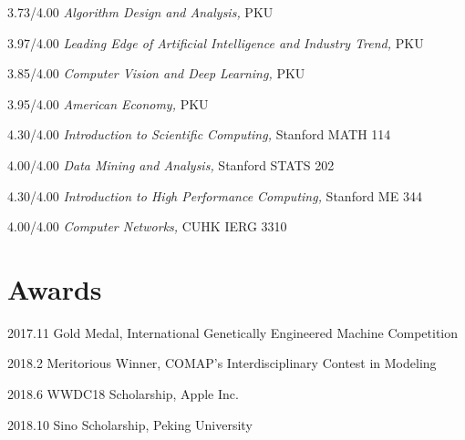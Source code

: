 \documentclass{academiccv}
\begin{document}
\begin{tablist}

\item[3.73/4.00] \tab \emph{Algorithm Design and Analysis}\emph, PKU
\item[3.97/4.00] \tab  \emph{Leading Edge of Artificial Intelligence and Industry Trend}\emph, PKU
\item[3.85/4.00] \tab \emph{Computer Vision and Deep Learning}\emph, PKU

\item[3.95/4.00] \tab \emph{American Economy}\emph, PKU

\item[4.30/4.00] \tab \emph{Introduction to Scientific Computing}\emph, Stanford MATH 114

\item[4.00/4.00] \tab \emph{Data Mining and Analysis}\emph, Stanford STATS 202

\item[4.30/4.00] \tab \emph{Introduction to High Performance Computing}\emph, Stanford ME 344

\item[4.00/4.00] \tab \emph{Computer Networks}\emph, CUHK IERG 3310

\end{tablist}


\section*{Awards}

\begin{tablist}
	\item[2017.11] \tab Gold Medal, International Genetically Engineered Machine Competition

	\item[2018.2] \tab Meritorious Winner, COMAP's Interdisciplinary Contest in Modeling

	\item[2018.6] \tab WWDC18 Scholarship, Apple Inc.
	
	\item[2018.10] \tab Sino Scholarship, Peking University

	\end{tablist}
\end{document}
